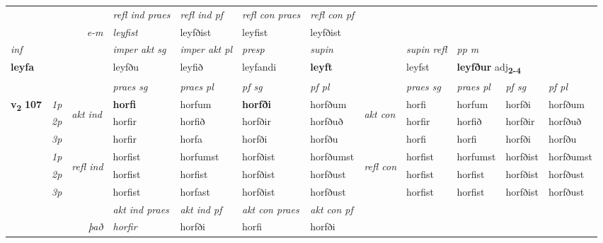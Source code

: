 \begin{longtable}[l]{X>{\footnotesize\itshape}llXXXXlXXXX}
 & && \textit{refl ind praes} & \textit{refl ind pf} & \textit{refl con praes} & \textit{refl con pf} \\*
\multicolumn{3}{r}{\textit{e-m}}& leyfist & leyfðist & leyfist & leyfðist \\*

\cmidrule{4-7}
   {\textit{inf}} & &  & \textit{imper akt sg} & \textit{imper akt pl}   & \textit{presp} & \textit{supin} && \textit{supin refl} & \textit{pp m} \\*
  {\textbf{leyfa}} & && leyfðu  & leyfið   & leyfandi &  \textbf{leyft} && leyfst & \multicolumn{2}{l}{\textbf{leyfður} adj\textbf{\textsubscript{2-4}}} \\*

\midrule

 & &   & \textit{praes sg}  & \textit{praes pl}    & \textit{ pf sg} & \textit{pf pl} & & \textit{praes sg}  & \textit{praes pl}    & \textit{pf sg} & \textit{pf pl }  \\ \cmidrule{4-7} \cmidrule{9-12}
 \multirow{2}{*}{{{\textbf{v{\textsubscript{2}}} \Large{\textbf{107}}}}}  & 1p & \multirow{3}{*}{\begin{turn}{90}\textit{akt ind}\end{turn}} & \textbf{horfi} & horfum & \textbf{horfði} & horfðum & \multirow{3}{*}{\begin{turn}{90}\textit{akt con}\end{turn}} &horfi & horfum & horfði & horfðum\\*
 & 2p &  &  horfir  & horfið & horfðir & horfðuð & & horfir & horfið & horfðir & horfðuð \\*
 & 3p &  & horfir & horfa & horfði & horfðu & & horfi & horfi& horfði & horfðu \\*
\cmidrule{4-7} \cmidrule{9-12}
 & 1p & \multirow{3}{*}{\begin{turn}{90}\textit{refl ind}\end{turn}}  & horfist & horfumst & horfðist & horfðumst & \multirow{3}{*}{\begin{turn}{90}\textit{refl con}\end{turn}}  &horfist & horfumst & horfðist & horfðumst \\*
 & 2p &  & horfist & horfist & horfðist & horfðust & &horfist & horfist & horfðist & horfðust \\*
 & 3p  & & horfist & horfast & horfðist & horfðust & & horfist & horfist& horfðist & horfðust \\*
\cmidrule{4-7} \cmidrule{9-12}

   && &  \textit{akt ind praes} & \textit{akt ind pf} & \textit{akt con praes} & \textit{akt con pf} \\*
\multicolumn{3}{r}{\textit{það}} & horfir & horfði & horfi & horfði \\*


\end{longtable}
